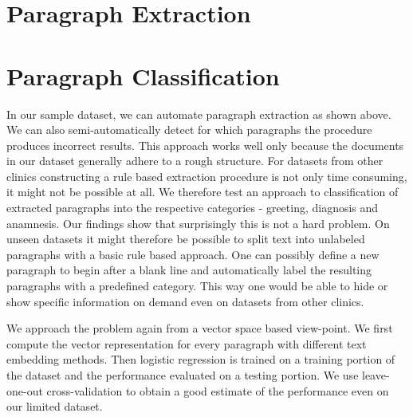 %


\section{Paragraph Extraction}



\section{Paragraph Classification}
In our sample dataset, we can automate paragraph extraction as shown above. We can also semi-automatically detect for which paragraphs the procedure produces incorrect results. This approach works well only because the documents in our dataset generally adhere to a rough structure. For datasets from other clinics constructing a rule based extraction procedure is not only time consuming, it might not be possible at all. We therefore test an approach to classification of extracted paragraphs into the respective categories - greeting, diagnosis and anamnesis. Our findings show that surprisingly this is not a hard problem. On unseen datasets it might therefore be possible to split text into unlabeled paragraphs with a basic rule based approach. One can possibly define a new paragraph to begin after a blank line and automatically label the resulting paragraphs with a predefined category. This way one would be able to hide or show specific information on demand even on datasets from other clinics.

We approach the problem again from a vector space based view-point. We first compute the vector representation for every paragraph with different text embedding methods. Then logistic regression is trained on a training portion of the dataset and the performance evaluated on a testing portion. We use leave-one-out cross-validation to obtain a good estimate of the performance even on our limited dataset.


